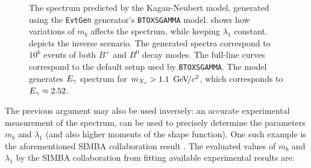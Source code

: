 \begin{figure}[htbp!]
    \caption{\label{fig:knmodel_variation}The \BtoXsgamma spectrum predicted by the Kagan-Neubert model, generated using the \texttt{EvtGen} generator's \texttt{BTOXSGAMMA} model.
     shows how variations of $m_b$ affects the spectrum, while keeping $\lambda_1$ constant.
     depicts the inverse scenario.
    The generated spectra correspond to $10^6$ events of both $B^+$ and $B^0$ decay modes.
    The full-line curves correspond to the default setup used by \texttt{BTOXSGAMMA}.
    The model generates ${E_{\gamma}}$ spectrum for $m_{X_s}>1.1~{\mathrm{\,Ge\kern -0.1em V\!/}c^2}$, which corresponds to ${E_{\gamma}}\approx2.52$.}
\end{figure}


The previous argument may also be used inversely: an accurate experimental measurement of the \BtoXsgamma spectrum, can be used to precisely determine the parameters $m_b$ and $\lambda_1$ (and also higher moments of the shape function).
One such example is the aforementioned SIMBA collaboration result \cite{Bernlochner:2020jlt}.
The evaluated values of $m_b$ and $\lambda_1$ by the SIMBA collaboration from fitting available \BtoXsgamma experimental results are:

